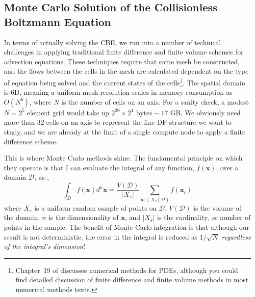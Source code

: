 \subsection{Monte Carlo Solution of the Collisionless Boltzmann Equation}

In terms of actually solving the CBE, we run into a number of technical challenges in applying traditional finite difference and finite volume schemes for advection equations. These techniques require that some mesh be constructed, and the flows between the cells in the mesh are calculated dependent on the type of equation being solved and the current states of the cells\footnote{Chapter~19 of \citet{numerical_recipes_fortran} discusses numerical methods for PDEs, although you could find detailed discussion of finite difference and finite volume methods in most numerical methods texts.}. The spatial domain is 6D, meaning a uniform mesh resolution scales in memory consumption as $O(N^6)$, where $N$ is the number of cells on an axis. For a sanity check, a modest $N = 2^5$ element grid would take up $2^{30} \times 2^4 \text{ bytes} \sim 17 \text{ GB}$. We obviously need more than 32 cells on an axis to represent the fine DF structure we want to study, and we are already at the limit of a single compute node to apply a finite difference scheme. 

This is where Monte Carlo methods shine. The fundamental principle on which they operate is that I can evaluate the integral of any function, $f(\textbf{x})$, over a domain $\mathcal{D}$, as \citep{numerical_recipes_fortran},
\begin{equation}
\int_\mathcal{D} f(\textbf{x}) d^{n} \textbf{x} = \frac{V(\mathcal{D})}{\vert X_s \vert} \sum_{\textbf{x}_i \in X_s(\mathcal{D})} f(\textbf{x}_i)
\end{equation}
where $X_s$ is a uniform random sample of points on $\mathcal{D}$, $V(\mathcal{D})$ is the volume of the domain, $n$ is the dimensionality of $\textbf{x}$, and $\vert X_s \vert$ is the cardinality, or number of points in the sample. The benefit of Monte Carlo integration is that although our result is not deterministic, the error in the integral is reduced as $1/\sqrt{N}$ \textit{regardless of the integral's dimension}! 

